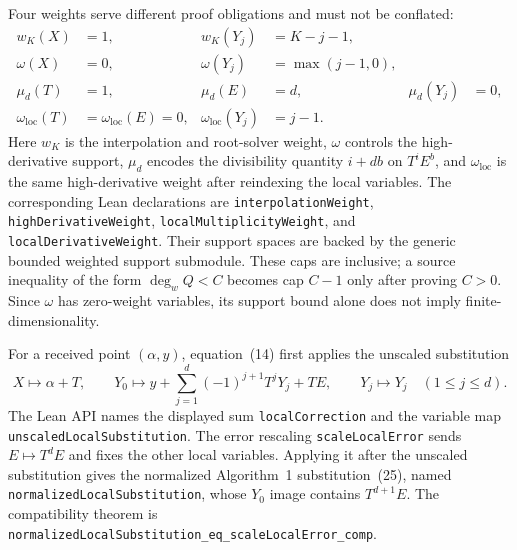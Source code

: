 Four weights serve different proof obligations and must not be conflated:
\begin{align*}
  w_K(X)&=1, & w_K(Y_j)&=K-j-1,\\
  \omega(X)&=0, & \omega(Y_j)&=\max(j-1,0),\\
  \mu_d(T)&=1, & \mu_d(E)&=d, & \mu_d(Y_j)&=0,\\
  \omega_{\mathrm{loc}}(T)&=\omega_{\mathrm{loc}}(E)=0,
    & \omega_{\mathrm{loc}}(Y_j)&=j-1.
\end{align*}
Here $w_K$ is the interpolation and root-solver weight, $\omega$ controls the high-derivative
support, $\mu_d$ encodes the divisibility quantity $i+db$ on $T^iE^b$, and
$\omega_{\mathrm{loc}}$ is the same high-derivative weight after reindexing the local variables.
The corresponding Lean declarations are \texttt{interpolationWeight},
\texttt{highDerivativeWeight}, \texttt{localMultiplicityWeight}, and
\texttt{localDerivativeWeight}.  Their support spaces are backed by the generic bounded weighted
support submodule.  These caps are inclusive; a source inequality of the form $\deg_w Q<C$ becomes
cap $C-1$ only after proving $C>0$.  Since $\omega$ has zero-weight variables, its support bound
alone does not imply finite-dimensionality.

\begin{definition}
  \label{def:hidden_derivative_weighted_supports}
  \leanok
\end{definition}

For a received point $(\alpha,y)$, equation~(14) first applies the unscaled substitution
\[
  X\mapsto\alpha+T,\qquad
  Y_0\mapsto y+\sum_{j=1}^d(-1)^{j+1}T^jY_j+TE,
  \qquad Y_j\mapsto Y_j\quad(1\le j\le d).
\]
The Lean API names the displayed sum \texttt{localCorrection} and the variable map
\texttt{unscaledLocalSubstitution}.  The error rescaling \texttt{scaleLocalError} sends
$E\mapsto T^dE$ and fixes the other local variables.  Applying it after the unscaled substitution
gives the normalized Algorithm~1 substitution~(25), named \texttt{normalizedLocalSubstitution},
whose $Y_0$ image contains $T^{d+1}E$.  The compatibility theorem is
\texttt{normalizedLocalSubstitution\_eq\_scaleLocalError\_comp}.

\begin{definition}
  \label{def:hidden_derivative_local_substitution}
  \leanok
\end{definition}

